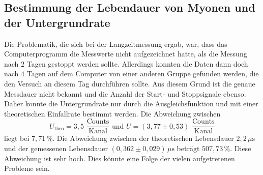 \subsection{Bestimmung der Lebendauer von Myonen und der Untergrundrate}
Die Problematik, die sich bei der Langzeitmessung ergab, war, dass das Computerprogramm die Messwerte nicht aufgezeichnet hatte, als
die Messung nach $2$ Tagen gestoppt werden sollte. Allerdings konnten die Daten dann doch nach $4$ Tagen auf dem Computer von einer 
anderen Gruppe gefunden werden, die den Versuch an diesem Tag durchführen sollte. Aus diesem Grund ist die genaue Messdauer nicht
bekannt und die Anzahl der Start- und Stoppsignale ebenso. Daher konnte die Untergrundrate nur durch die Ausgleichsfunktion und 
mit einer theoretischen Einfallrate bestimmt werden. Die Abweichung zwischen 
$$U_{\text{theo}} = 3,5 \,\, \frac{\text{Counts}}{\text{Kanal}}\,\, \text{und} \,\, U = (3,77 \pm 0,53) \,\, \frac{\text{Counts}}{\text{Kanal}}$$
liegt bei $7,71 \, \%$. Die Abweichung zwischen der theoretischen Lebensdauer $2,2 \, \unit{\mu\second}$ und der gemessenen Lebensdauer 
$(0,362 \pm 0,029)\, \unit{\mu\second}$ beträgt $507,73 \, \%$. Diese Abweichung ist sehr hoch. Dies könnte eine Folge der vielen 
aufgetretenen Probleme sein.

